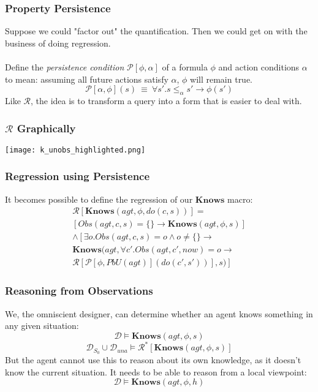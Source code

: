 \documentclass{beamer}
\begin{document}
\begin{frame}
\frametitle{Property Persistence}
Suppose we could "factor out" the quantification. Then we could get
on with the business of doing regression. 
\ \\
\ \\
Define the \emph{persistence condition} $\mathcal{P}[\phi,\alpha]$ of a formula
 $\phi$ and action conditions $\alpha$ to mean: assuming all future actions
satisfy $\alpha$, $\phi$ will remain true.
\begin{equation*}
  \mathcal{P}[\alpha,\phi](s)\ \equiv\ \forall s' . s \leq_{\alpha} s' \rightarrow \phi(s')
\end{equation*}
Like $\mathcal{R}$, the idea is to transform a query into a form that is easier
to deal with.
\end{frame}

\begin{frame}
\frametitle{$\mathcal{R}$ Graphically}
\begin{center}
  \texttt{[image: k\_unobs\_highlighted.png]}
\end{center}
\end{frame}

\begin{frame}
\frametitle{Regression using Persistence}
It becomes possible to define the regression of our $\mathbf{Knows}$ macro:
\begin{multline*}
  \mathcal{R}[\mathbf{Knows}(agt,\phi,do(c,s))] = \\
     \left[ Obs(agt,c,s) = \{\} \rightarrow \mathbf{Knows}(agt,\phi,s) \right] \\
     \wedge \left[ \exists o . Obs(agt,c,s) = o \wedge o\neq \{\} \rightarrow \right. \\
     \mathbf{Knows}(agt,\forall c' . Obs(agt,c',now)=o \rightarrow \\
     \left.\mathcal{R}[\mathcal{P}[\phi,PbU(agt)](do(c',s'))],s)\right]
\end{multline*}
\end{frame}

\begin{frame}
\frametitle{Reasoning from Observations}
We, the omniscient designer, can determine whether an agent knows something
 in any given situation:
\begin{equation*}
  \mathcal{D} \models \mathbf{Knows}(agt,\phi,s)
\end{equation*}
\begin{equation*}
  \mathcal{D}_{S_0} \cup \mathcal{D}_{una} \models \mathcal{R}^{*}[\mathbf{Knows}(agt,\phi,s)]
\end{equation*}
But the agent cannot use this to reason about its own knowledge, as it doesn't
know the current situation.  It needs to be able to reason from a local
viewpoint:
\begin{equation*}
  \mathcal{D} \models \mathbf{Knows}(agt,\phi,h)
\end{equation*}
\end{frame}
\end{document}
